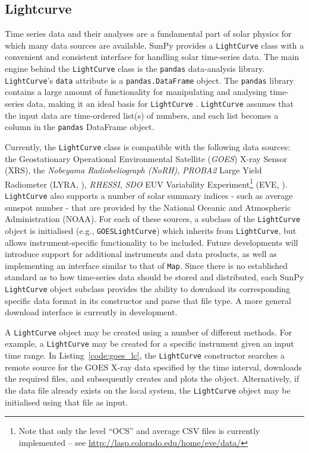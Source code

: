 \subsection{Lightcurve}\label{ssec:lightcurve}

Time series data and their analyses are a fundamental part of solar
physics for which many data sources are available.
SunPy provides a \texttt{LightCurve} class
with a convenient and consistent interface for handling solar time-series
data.  The main engine behind the \texttt{LightCurve} class is
the {\texttt{pandas}} data-analysis library.  
\texttt{LightCurve}'s \texttt{data} attribute is a \texttt{pandas.DataFrame} 
object. The \texttt{pandas} library contains a large amount
of functionality for manipulating and analysing time-series data,
making it an ideal basis for \texttt{LightCurve} \citep{mckinney2012}.  \texttt{LightCurve}
assumes that the input data are time-ordered list(s) of numbers, and each
list becomes a column in the \texttt{pandas} DataFrame object.

Currently, the \texttt{LightCurve} class is compatible with the
following data sources: the Geostationary Operational Environmental
Satellite (\textit{GOES}) X-ray Sensor (XRS), the \textit{Nobeyama
  Radioheliograph (NoRH)}, \textit{PROBA2} Large Yield Radiometer
(LYRA, \citealt{2013SoPh..286...21D}), \textit{RHESSI},
\textit{SDO} EUV Variability Experiment\footnote{Note that only the level ``OCS'' and average
  CSV files is currently implemented -- see
  \url{http://lasp.colorado.edu/home/eve/data/}} (EVE, \citealt{2012SoPh..275..115W}). 
\texttt{LightCurve}
also supports a number of solar summary indices - such as average
sunspot number - that are provided by the National Oceanic and
Atmospheric Administration (NOAA).  For each of these sources, a
subclass of the \texttt{LightCurve} object is initialised (e.g.,
\texttt{GOESLightCurve}) which inherits from \texttt{LightCurve}, but
allows instrument-specific functionality to be included.  Future
developments will introduce support for additional instruments and
data products, as well as implementing an interface similar to that of
\texttt{Map}.  Since there is no established standard as to how
time-series data should be stored and distributed, each SunPy
\texttt{LightCurve} object subclass provides the ability to download
its corresponding specific data format in its constructor and parse
that file type. A more general download interface is currently in development.

A \texttt{LightCurve} object may be created using a number of different methods. 
For example, a \texttt{LightCurve} may be created for a specific instrument given
an input time range. In Listing~\ref{code:goes_lc}, 
the \texttt{LightCurve} constructor searches a remote source for the GOES X-ray 
data specified by the time interval, downloads the required files, and 
subsequently creates and plots the object. Alternatively, if the data file 
already exists on the local system, the \texttt{LightCurve} object may be 
initialised using that file as input.


